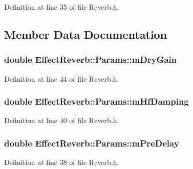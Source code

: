 Definition at line 35 of file Reverb.\+h.



\subsection{Member Data Documentation}
\subsubsection[{\texorpdfstring{m\+Dry\+Gain}{mDryGain}}]{\setlength{\rightskip}{0pt plus 5cm}double Effect\+Reverb\+::\+Params\+::m\+Dry\+Gain}\hypertarget{struct_effect_reverb_1_1_params_abefa3f74bd0707d9618badf84d176d18}{}\label{struct_effect_reverb_1_1_params_abefa3f74bd0707d9618badf84d176d18}


Definition at line 44 of file Reverb.\+h.

\subsubsection[{\texorpdfstring{m\+Hf\+Damping}{mHfDamping}}]{\setlength{\rightskip}{0pt plus 5cm}double Effect\+Reverb\+::\+Params\+::m\+Hf\+Damping}\hypertarget{struct_effect_reverb_1_1_params_a07756d33110544322adc8c6c37a27df1}{}\label{struct_effect_reverb_1_1_params_a07756d33110544322adc8c6c37a27df1}


Definition at line 40 of file Reverb.\+h.

\subsubsection[{\texorpdfstring{m\+Pre\+Delay}{mPreDelay}}]{\setlength{\rightskip}{0pt plus 5cm}double Effect\+Reverb\+::\+Params\+::m\+Pre\+Delay}\hypertarget{struct_effect_reverb_1_1_params_abd817851e80caef37f0ca121917f6169}{}\label{struct_effect_reverb_1_1_params_abd817851e80caef37f0ca121917f6169}


Definition at line 38 of file Reverb.\+h.

